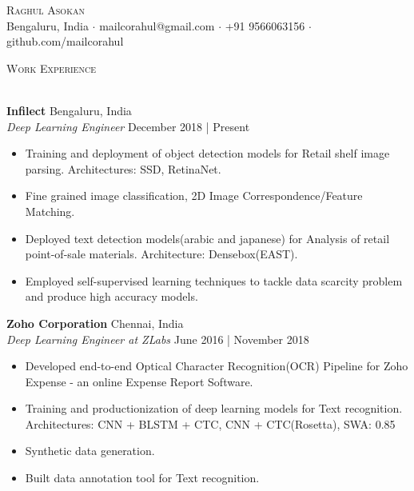 \documentclass[a4paper]{article}
\newcommand{\lineunder} {
    \vspace*{-8pt} \\
    \hspace*{-18pt} \hrulefill \\
}
\newcommand{\header} [1] {
    {\hspace*{-18pt}\vspace*{6pt} \textsc{#1}}
    \vspace*{-6pt} \lineunder
}
\begin{document}
\vspace*{-40pt}



\vspace*{-10pt}
\begin{center}
	{\Huge \scshape {Raghul Asokan}}\\
	Bengaluru, India $\cdot$ mailcorahul@gmail.com $\cdot$ +91 9566063156 $\cdot$ github.com/mailcorahul\\
\end{center}

\header{Work Experience}
\vspace{1mm}

\textbf{Infilect} \hfill Bengaluru, India\\
\textit{Deep Learning Engineer} \hfill December 2018 | Present\\

\begin{itemize}
    \itemsep-0.5em
    \item Training and deployment of object detection models for Retail shelf image parsing. Architectures: SSD, RetinaNet.
    \item Fine grained image classification, 2D Image Correspondence/Feature Matching.
    \item Deployed text detection models(arabic and japanese) for Analysis of retail point-of-sale materials. Architecture: Densebox(EAST).
    \item Employed self-supervised learning techniques to tackle data scarcity problem and produce high accuracy models.
\end{itemize}
\vspace*{1mm}

\textbf{Zoho Corporation} \hfill Chennai, India\\
\textit{Deep Learning Engineer at ZLabs} \hfill June 2016 | November 2018\\

\begin{itemize}
    \itemsep-0.5em
    \item Developed end-to-end Optical Character Recognition(OCR) Pipeline for Zoho Expense - an online Expense Report Software.
    \item Training and productionization of deep learning models for Text recognition. Architectures: CNN + BLSTM + CTC, CNN + CTC(Rosetta), SWA: 0.85
    \item Synthetic data generation.
    \item Built data annotation tool for Text recognition.
\end{itemize}
\end{document}
